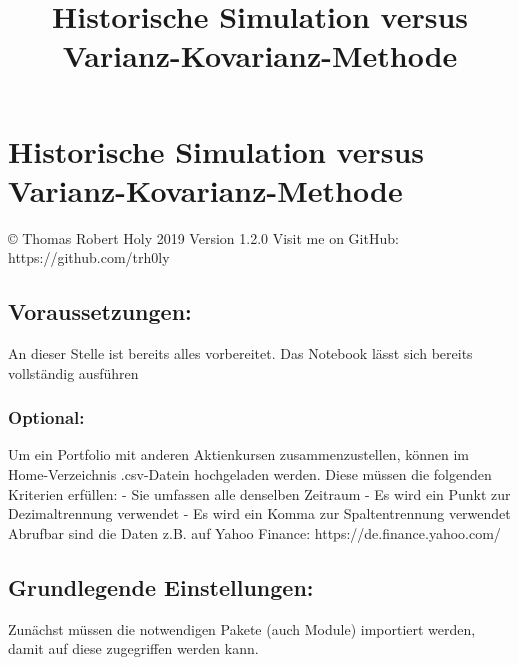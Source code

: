 \documentclass[paper=landscape]{scrartcl}
\title{Historische Simulation versus Varianz-Kovarianz-Methode}
\begin{document}
    
    
    \maketitle
    
    

    
    \hypertarget{historische-simulation-versus-varianz-kovarianz-methode}{%
\section{Historische Simulation versus
Varianz-Kovarianz-Methode}\label{historische-simulation-versus-varianz-kovarianz-methode}}

© Thomas Robert Holy 2019 Version 1.2.0 Visit me on GitHub:
https://github.com/trh0ly

\hypertarget{voraussetzungen}{%
\subsection{Voraussetzungen:}\label{voraussetzungen}}

An dieser Stelle ist bereits alles vorbereitet. Das Notebook lässt sich
bereits vollständig ausführen

\hypertarget{optional}{%
\subsubsection{Optional:}\label{optional}}

Um ein Portfolio mit anderen Aktienkursen zusammenzustellen, können im
Home-Verzeichnis .csv-Datein hochgeladen werden. Diese müssen die
folgenden Kriterien erfüllen: - Sie umfassen alle denselben Zeitraum -
Es wird ein Punkt zur Dezimaltrennung verwendet - Es wird ein Komma zur
Spaltentrennung verwendet Abrufbar sind die Daten z.B. auf Yahoo
Finance: https://de.finance.yahoo.com/

\hypertarget{grundlegende-einstellungen}{%
\subsection{Grundlegende
Einstellungen:}\label{grundlegende-einstellungen}}

Zunächst müssen die notwendigen Pakete (auch Module) importiert werden,
damit auf diese zugegriffen werden kann.
\end{document}
